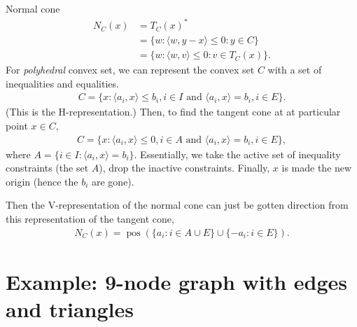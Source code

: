 \documentclass{amsbook}
\DeclareMathOperator{\pos}{pos}
\newcommand{\inner}[1]{\langle #1 \rangle}
\theoremstyle{definition}
\theoremstyle{remark}
\begin{document}
Normal cone
\begin{align*}
	N_C(x) 	&= T_C(x)^* \\
			&= \{ w: \inner{ w, y-x } \leq 0: y \in C \}  \\
			&= \{ w: \inner{ w, v } \leq 0: v \in T_C(x) \}.
\end{align*}
For \emph{polyhedral} convex set, we can represent the convex set $C$ with a set of inequalities and equalities.
\begin{align*}
	C = \{ x: \inner{a_i, x} \leq b_i, i \in I \text{ and } \inner{a_i, x} = b_i, i \in E \}.
\end{align*}
(This is the H-representation.)  Then, to find the tangent cone at at particular point $x \in C$, 
\begin{align*}
	C = \{ x: \inner{a_i, x} \leq 0, i \in A \text{ and } \inner{a_i, x} = b_i, i \in E \},
\end{align*}
where $A = \{ i \in I: \inner{a_i,x} = b_i\}$.  Essentially, we take the active set of inequality constraints (the set $A$), drop the inactive constraints.  Finally, $x$ is made the new origin (hence the $b_i$ are gone).

Then the V-representation of the normal cone can just be gotten direction from this representation of the tangent cone,
\begin{align*}
	N_C(x) = \pos( \{ a_i: i \in A \cup E\} \cup \{ - a_i: i \in E \} ).
\end{align*}

\section{Example: 9-node graph with edges and triangles}
\end{document}
